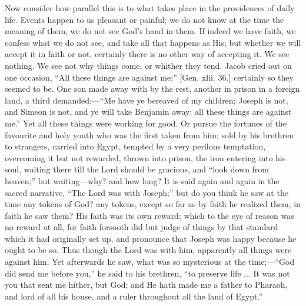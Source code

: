 Now consider how parallel this is to what takes place in the
providences of daily life. Events happen to us pleasant or painful; we
do not know at the time the meaning of them, we do not see God's
hand in them. If indeed we have faith, we confess what we do not see,
and take all that happens as His; but whether we will accept it in
faith or not, certainly there is no other way of accepting it. We see
nothing. We see not why things come, or whither they tend. Jacob cried
out on one occasion, ``All these things are against me;''
[Gen. xlii. 36.] certainly so they seemed to be. One son made away
with by the rest, another in prison in a foreign land, a third
demanded;—``Me have ye bereaved of my children; Joseph is not,
and Simeon is not, and ye will take Benjamin away: all these things
are against me.'' Yet all these things were working for good. Or
pursue the fortunes of the favourite and holy youth who was the first
taken from him; sold by his brethren to strangers, carried into Egypt,
tempted by a very perilous temptation, overcoming it but not rewarded,
thrown into prison, the iron entering into his soul, waiting there
till the Lord should be gracious, and ``look down from
heaven;'' but waiting—why? and how long? It is said again and
again in the sacred narrative, ``The Lord was with Joseph;''
but do you think he saw at the time any tokens of God? any tokens,
except so far as by faith he realized them, in faith he saw them? His
faith was its own reward; which to the eye of reason was no reward at
all, for faith forsooth did but judge of things by that standard which
it had originally set up, and pronounce that Joseph was happy because
he ought to be so. Thus though the Lord was with him, apparently all
things were against him. Yet afterwards he saw, what was so mysterious
at the time;—``God did send me before you,'' he said to his
brethren, ``to preserve life ... It was not you that sent me
hither, but God; and He hath made me a father to Pharaoh, and lord of
all his house, and a ruler throughout all the land of Egypt.''

